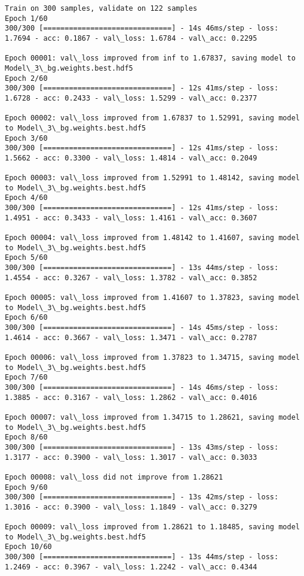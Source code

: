 \documentclass[11pt]{article}
\begin{document}
    \begin{Verbatim}[commandchars=\\\{\}]
Train on 300 samples, validate on 122 samples
Epoch 1/60
300/300 [==============================] - 14s 46ms/step - loss: 1.7694 - acc: 0.1867 - val\_loss: 1.6784 - val\_acc: 0.2295

Epoch 00001: val\_loss improved from inf to 1.67837, saving model to Model\_3\_bg.weights.best.hdf5
Epoch 2/60
300/300 [==============================] - 12s 41ms/step - loss: 1.6728 - acc: 0.2433 - val\_loss: 1.5299 - val\_acc: 0.2377

Epoch 00002: val\_loss improved from 1.67837 to 1.52991, saving model to Model\_3\_bg.weights.best.hdf5
Epoch 3/60
300/300 [==============================] - 12s 41ms/step - loss: 1.5662 - acc: 0.3300 - val\_loss: 1.4814 - val\_acc: 0.2049

Epoch 00003: val\_loss improved from 1.52991 to 1.48142, saving model to Model\_3\_bg.weights.best.hdf5
Epoch 4/60
300/300 [==============================] - 12s 41ms/step - loss: 1.4951 - acc: 0.3433 - val\_loss: 1.4161 - val\_acc: 0.3607

Epoch 00004: val\_loss improved from 1.48142 to 1.41607, saving model to Model\_3\_bg.weights.best.hdf5
Epoch 5/60
300/300 [==============================] - 13s 44ms/step - loss: 1.4554 - acc: 0.3267 - val\_loss: 1.3782 - val\_acc: 0.3852

Epoch 00005: val\_loss improved from 1.41607 to 1.37823, saving model to Model\_3\_bg.weights.best.hdf5
Epoch 6/60
300/300 [==============================] - 14s 45ms/step - loss: 1.4614 - acc: 0.3667 - val\_loss: 1.3471 - val\_acc: 0.2787

Epoch 00006: val\_loss improved from 1.37823 to 1.34715, saving model to Model\_3\_bg.weights.best.hdf5
Epoch 7/60
300/300 [==============================] - 14s 46ms/step - loss: 1.3885 - acc: 0.3167 - val\_loss: 1.2862 - val\_acc: 0.4016

Epoch 00007: val\_loss improved from 1.34715 to 1.28621, saving model to Model\_3\_bg.weights.best.hdf5
Epoch 8/60
300/300 [==============================] - 13s 43ms/step - loss: 1.3177 - acc: 0.3900 - val\_loss: 1.3017 - val\_acc: 0.3033

Epoch 00008: val\_loss did not improve from 1.28621
Epoch 9/60
300/300 [==============================] - 13s 42ms/step - loss: 1.3016 - acc: 0.3900 - val\_loss: 1.1849 - val\_acc: 0.3279

Epoch 00009: val\_loss improved from 1.28621 to 1.18485, saving model to Model\_3\_bg.weights.best.hdf5
Epoch 10/60
300/300 [==============================] - 13s 44ms/step - loss: 1.2469 - acc: 0.3967 - val\_loss: 1.2242 - val\_acc: 0.4344


\end{Verbatim}
\end{document}
